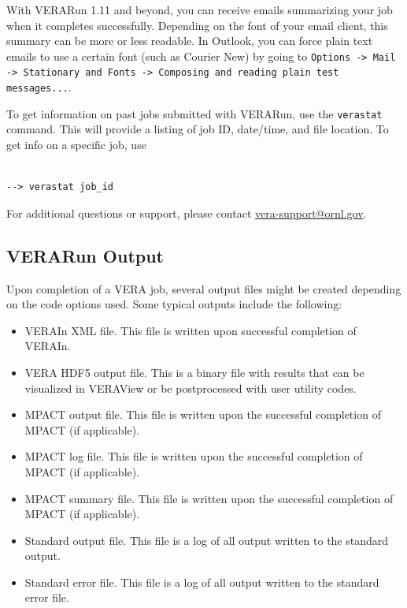 With VERARun 1.11 and beyond, you can receive emails summarizing your job when it completes successfully.
Depending on the font of your email client, this summary can be more or less readable.
In Outlook, you can force plain text emails to use a certain font (such as Courier New) by going to \texttt{Options -> Mail -> Stationary and Fonts -> Composing and reading plain test messages...}.

To get information on past jobs submitted with VERARun, use the \texttt{verastat} command. This will provide a listing of job ID, date/time, and file location. To get info on a specific job, use
\begin{Verbatim}[fontsize=\small]

--> verastat job_id

\end{Verbatim}

For additional questions or support, please contact \href{vera-support@ornl.gov}{vera-support@ornl.gov}.

\subsection{VERARun Output}

Upon completion of a VERA job, several output files might be created depending on the code options used.
Some typical outputs include the following:
\begin{itemize}
\item VERAIn XML file. This file is written upon successful completion of VERAIn.
\item VERA HDF5 output file. This is a binary file with results that can be visualized in VERAView or be postprocessed with user utility codes.
\item MPACT output file. This file is written upon the successful completion of MPACT (if applicable).
\item MPACT log file. This file is written upon the successful completion of MPACT (if applicable).
\item MPACT summary file. This file is written upon the successful completion of MPACT (if applicable).
\item Standard output file. This file is a log of all output written to the standard output.
\item Standard error file. This file is a log of all output written to the standard error file.
\end{itemize}



